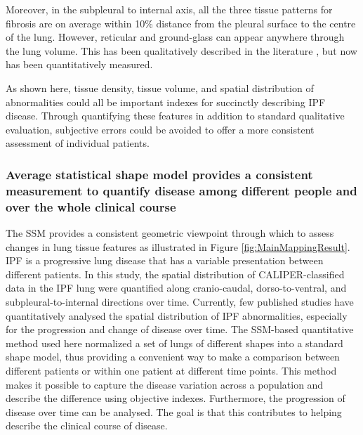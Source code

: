 Moreover, in the subpleural to internal axis, all the three tissue patterns for fibrosis are on average within 10\% distance from the pleural surface to the centre of the lung. However, reticular and ground-glass can appear anywhere through the lung volume. This has been qualitatively described in the literature \citep{king2011idiopathic}, but now has been quantitatively measured. 

As shown here, tissue density, tissue volume, and spatial distribution of abnormalities could all be important indexes for succinctly describing IPF disease. Through quantifying these features in addition to standard qualitative evaluation, subjective errors could be avoided to offer a more consistent assessment of individual patients.

\subsubsection{Average statistical shape model provides a consistent measurement to quantify disease among different people and over the whole clinical course}
The SSM provides a consistent geometric viewpoint through which to assess changes in lung tissue features as illustrated in Figure \ref{fig:MainMappingResult}. IPF is a progressive lung disease that has a variable presentation between different patients. In this study, the spatial distribution of CALIPER-classified data in the IPF lung were quantified along cranio-caudal, dorso-to-ventral, and subpleural-to-internal directions over time. Currently, few published studies have quantitatively analysed the spatial distribution of IPF abnormalities, especially for the progression and change of disease over time. The SSM-based quantitative method used here normalized a set of lungs of different shapes into a standard shape model, thus providing a convenient way to make a comparison between different patients or within one patient at different time points. This method makes it possible to capture the disease variation across a population and describe the difference using objective indexes. Furthermore, the progression of disease over time can be analysed. The goal is that this contributes to helping describe the clinical course of disease. 

